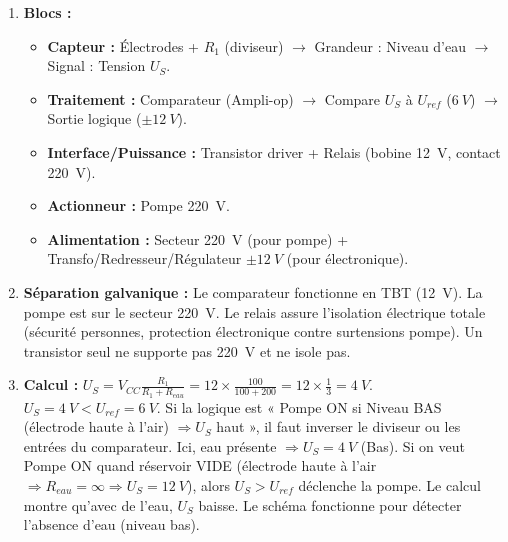 \documentclass[11pt]{article}
\begin{document}
\begin{corrige}
\begin{enumerate}
\item \textbf{Blocs :}
    \begin{itemize}
    \item \textbf{Capteur :} Électrodes + $R_1$ (diviseur) $\rightarrow$ Grandeur : Niveau d'eau $\rightarrow$ Signal : Tension $U_S$.
    \item \textbf{Traitement :} Comparateur (Ampli-op) $\rightarrow$ Compare $U_S$ à $U_{ref}$ ($\SI{6}{V}$) $\rightarrow$ Sortie logique ($\pm \SI{12}{V}$).
    \item \textbf{Interface/Puissance :} Transistor driver + Relais (bobine \SI{12}{V}, contact \SI{220}{V}).
    \item \textbf{Actionneur :} Pompe \SI{220}{V}.
    \item \textbf{Alimentation :} Secteur \SI{220}{V} (pour pompe) + Transfo/Redresseur/Régulateur $\pm \SI{12}{V}$ (pour électronique).
    \end{itemize}
\item \textbf{Séparation galvanique :} Le comparateur fonctionne en TBT (\SI{12}{V}). La pompe est sur le secteur \SI{220}{V}. Le relais assure l'isolation électrique totale (sécurité personnes, protection électronique contre surtensions pompe). Un transistor seul ne supporte pas \SI{220}{V} et ne isole pas.
\item \textbf{Calcul :} $U_S = V_{CC} \frac{R_1}{R_1 + R_{eau}} = 12 \times \frac{100}{100+200} = 12 \times \frac{1}{3} = \SI{4}{V}$.
    $U_S = \SI{4}{V} < U_{ref} = \SI{6}{V}$. Si la logique est « Pompe ON si Niveau BAS (électrode haute à l'air) $\Rightarrow U_S$ haut », il faut inverser le diviseur ou les entrées du comparateur. Ici, eau présente $\Rightarrow U_S=\SI{4}{V}$ (Bas). Si on veut Pompe ON quand réservoir VIDE (électrode haute à l'air $\Rightarrow R_{eau}=\infty \Rightarrow U_S=\SI{12}{V}$), alors $U_S > U_{ref}$ déclenche la pompe. Le calcul montre qu'avec de l'eau, $U_S$ baisse. Le schéma fonctionne pour détecter l'absence d'eau (niveau bas).
\end{enumerate}
\end{corrige}
\end{document}
